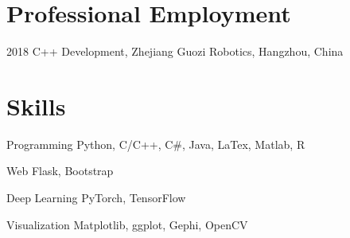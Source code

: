 \documentclass[12pt,letterpaper]{report}
\begin{document}
    \section*{Professional Employment}
    \begin{tablist}
        \item[2018] \tab{}C++ Development, Zhejiang Guozi Robotics, Hangzhou, China
    \end{tablist}

    \section*{Skills}
    \begin{tablist}
        \item[Programming] \tab{}Python, C/C++, C\#, Java, LaTex, Matlab, R
        \item[Web] \tab{}\tab{}Flask, Bootstrap
        \item[Deep Learning] \tab{}PyTorch, TensorFlow
        \item[Visualization] \tab{}Matplotlib, ggplot, Gephi, OpenCV
    \end{tablist}
\end{document}
